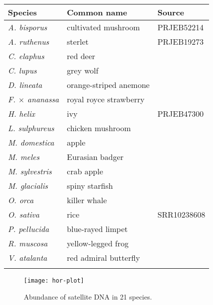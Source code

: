 \documentclass{bioinfo}
\begin{document}
\begin{table}[bt]
{\label{tab:dtol}
\begin{tabular}{lll}
\toprule
Species & Common name & Source \\
\midrule
\emph{A. bisporus} & cultivated mushroom & PRJEB52214 \\
\emph{A. ruthenus} & sterlet & PRJEB19273 \\
\emph{C. elaphus} & red deer & \citet{pemberton_genome_2021} \\
\emph{C. lupus} & grey wolf & \citet{sinding_genome_2021}\\
\emph{D. lineata} & orange-striped anemone & \citet{wood_genome_2022} \\
\emph{F. $\times$ ananassa} & royal royce strawberry & \citet{Hon:2020aa} \\
\emph{H. helix} & ivy & PRJEB47300 \\
\emph{L. sulphureus} & chicken mushroom & \citet{wright_genome_2022} \\
\emph{M. domestica} & apple & \citet{konyves_genome_2022} \\
\emph{M. meles} & Eurasian badger & \citet{newman_genome_2022} \\
\emph{M. sylvestris} & crab apple & \citet{ruhsam_genome_2022} \\
\emph{M. glacialis} & spiny starfish & \citet{lawniczak_genome_2021} \\
\emph{O. orca} & killer whale & \citet{foote_genome_2022} \\
\emph{O. sativa} & rice & SRR10238608 \\
\emph{P. pellucida} & blue-rayed limpet & \citet{lawniczak_genome_2022} \\
\emph{R. muscosa} & yellow-legged frog & \citet{Hon:2020aa} \\
\emph{V. atalanta} & red admiral butterfly & \citet{lohse_genome_2021} \\
\botrule
\end{tabular}}{}
\end{table}

\begin{figure}
\texttt{[image: hor-plot]}
\caption{Abundance of satellite DNA in 21 species.}\label{fig:dtol}
\end{figure}
\end{document}
